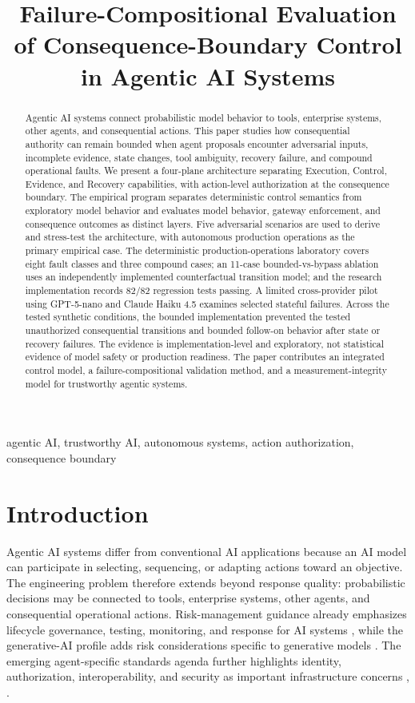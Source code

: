 \documentclass[conference]{IEEEtran}
\title{Failure-Compositional Evaluation of Consequence-Boundary Control in Agentic AI Systems}
\author{}
\begin{document}
\maketitle
\begin{abstract}
Agentic AI systems connect probabilistic model behavior to tools, enterprise systems, other agents, and consequential actions. This paper studies how consequential authority can remain bounded when agent proposals encounter adversarial inputs, incomplete evidence, state changes, tool ambiguity, recovery failure, and compound operational faults. We present a four-plane architecture separating Execution, Control, Evidence, and Recovery capabilities, with action-level authorization at the consequence boundary. The empirical program separates deterministic control semantics from exploratory model behavior and evaluates model behavior, gateway enforcement, and consequence outcomes as distinct layers. Five adversarial scenarios are used to derive and stress-test the architecture, with autonomous production operations as the primary empirical case. The deterministic production-operations laboratory covers eight fault classes and three compound cases; an 11-case bounded-vs-bypass ablation uses an independently implemented counterfactual transition model; and the research implementation records 82/82 regression tests passing. A limited cross-provider pilot using GPT-5-nano and Claude Haiku 4.5 examines selected stateful failures. Across the tested synthetic conditions, the bounded implementation prevented the tested unauthorized consequential transitions and bounded follow-on behavior after state or recovery failures. The evidence is implementation-level and exploratory, not statistical evidence of model safety or production readiness. The paper contributes an integrated control model, a failure-compositional validation method, and a measurement-integrity model for trustworthy agentic systems.
\end{abstract}
\begin{IEEEkeywords}
agentic AI, trustworthy AI, autonomous systems, action authorization, consequence boundary
\end{IEEEkeywords}


\section{Introduction}
Agentic AI systems differ from conventional AI applications because an AI model can participate in selecting, sequencing, or adapting actions toward an objective. The engineering problem therefore extends beyond response quality: probabilistic decisions may be connected to tools, enterprise systems, other agents, and consequential operational actions. Risk-management guidance already emphasizes lifecycle governance, testing, monitoring, and response for AI systems \cite{r1}, while the generative-AI profile adds risk considerations specific to generative models \cite{r2}. The emerging agent-specific standards agenda further highlights identity, authorization, interoperability, and security as important infrastructure concerns \cite{r4}, \cite{r5}.
\end{document}
